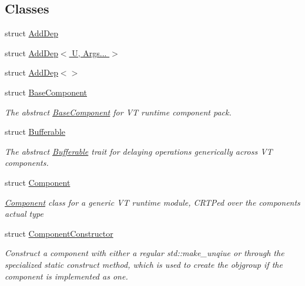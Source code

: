 \subsection*{Classes}
\begin{DoxyCompactItemize}
\item 
struct \hyperlink{structvt_1_1runtime_1_1component_1_1_add_dep}{Add\+Dep}
\item 
struct \hyperlink{structvt_1_1runtime_1_1component_1_1_add_dep_3_01_u_00_01_args_8_8_8_01_4}{Add\+Dep$<$ U, Args... $>$}
\item 
struct \hyperlink{structvt_1_1runtime_1_1component_1_1_add_dep_3_4}{Add\+Dep$<$$>$}
\item 
struct \hyperlink{structvt_1_1runtime_1_1component_1_1_base_component}{Base\+Component}
\begin{DoxyCompactList}\small\item\em The abstract {\ttfamily \hyperlink{structvt_1_1runtime_1_1component_1_1_base_component}{Base\+Component}} for VT runtime component pack. \end{DoxyCompactList}\item 
struct \hyperlink{structvt_1_1runtime_1_1component_1_1_bufferable}{Bufferable}
\begin{DoxyCompactList}\small\item\em The abstract {\ttfamily \hyperlink{structvt_1_1runtime_1_1component_1_1_bufferable}{Bufferable}} trait for delaying operations generically across VT components. \end{DoxyCompactList}\item 
struct \hyperlink{structvt_1_1runtime_1_1component_1_1_component}{Component}
\begin{DoxyCompactList}\small\item\em {\ttfamily \hyperlink{structvt_1_1runtime_1_1component_1_1_component}{Component}} class for a generic VT runtime module, C\+R\+TP\textquotesingle{}ed over the component\textquotesingle{}s actual type \end{DoxyCompactList}\item 
struct \hyperlink{structvt_1_1runtime_1_1component_1_1_component_constructor}{Component\+Constructor}
\begin{DoxyCompactList}\small\item\em Construct a component with either a regular {\ttfamily std\+::make\+\_\+unqiue} or through the specialized static {\ttfamily construct} method, which is used to create the objgroup if the component is implemented as one. \end{DoxyCompactList}\item 

\end{DoxyCompactItemize}

